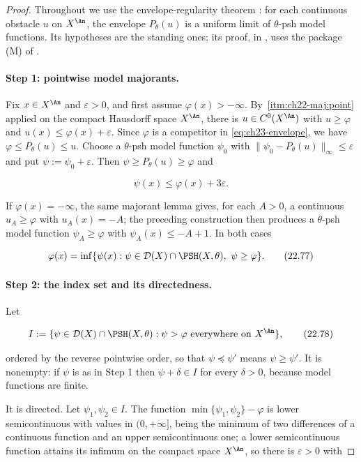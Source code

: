\begin{proof}
Throughout we use the envelope-regularity theorem
: for each continuous obstacle $u$ on
$X^{\An}$, the envelope $P_\theta(u)$ is a uniform limit of
$\theta$-psh model functions.  Its hypotheses are the standing ones; its
proof, in , uses the package \textup{(M)} of
.

\paragraph{Step 1: pointwise model majorants.}
Fix $x\in X^{\An}$ and $\varepsilon>0$, and first assume
$\varphi(x)>-\infty$.  By
\,\cref{itm:ch22-maj:point} applied on the
compact Hausdorff space $X^{\An}$, there is $u\in C^0(X^{\An})$ with
$u\geq\varphi$ and $u(x)\leq\varphi(x)+\varepsilon$.  Since $\varphi$
is a competitor in \eqref{eq:ch23-envelope}, we have
$\varphi\leq P_\theta(u)\leq u$.  Choose a $\theta$-psh model function
$\psi_0$ with $\|\psi_0-P_\theta(u)\|_\infty\leq\varepsilon$ and put
$\psi:=\psi_0+\varepsilon$.  Then $\psi\geq P_\theta(u)\geq\varphi$ and

\[
                         \psi(x)\leq\varphi(x)+3\varepsilon.
\tag{22.76}\label{eq:ch22-pointwise-majorant}
\]

If $\varphi(x)=-\infty$, the same majorant lemma gives, for each
$A>0$, a continuous $u_A\geq\varphi$ with $u_A(x)=-A$; the preceding
construction then produces a $\theta$-psh model function
$\psi_A\geq\varphi$ with $\psi_A(x)\leq-A+1$.  In both cases

\[
 \varphi(x)=\inf\{\psi(x):
       \psi\in\mathcal D(X)\cap\PSH(X,\theta),\ \psi\geq\varphi\}.
\tag{22.77}\label{eq:ch22-inf-majorants}
\]

\paragraph{Step 2: the index set and its directedness.}
Let

\[
 I:=\{\psi\in\mathcal D(X)\cap\PSH(X,\theta):
       \psi>\varphi\ \text{everywhere on }X^{\An}\},
\tag{22.78}\label{eq:ch22-index-set}
\]

ordered by the reverse pointwise order, so that $\psi\preceq\psi'$ means
$\psi\geq\psi'$.  It is nonempty: if $\psi$ is as in Step 1 then
$\psi+\delta\in I$ for every $\delta>0$, because model functions are
finite.

It is directed.  Let $\psi_1,\psi_2\in I$.  The function
$\min\{\psi_1,\psi_2\}-\varphi$ is lower semicontinuous with values in
$(0,+\infty]$, being the minimum of two differences of a continuous
function and an upper semicontinuous one; a lower semicontinuous function
attains its infimum on the compact space $X^{\An}$, so there is
$\varepsilon>0$ with


\end{proof}
